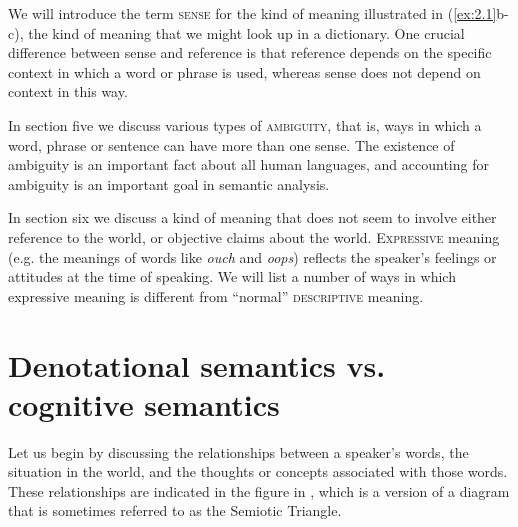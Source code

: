 We will introduce the term \textsc{sense} for the kind of meaning illustrated in (\ref{ex:2.1}b-c), the kind of meaning that we might look up in a dictionary. One crucial difference between sense and reference is that reference depends on the specific context in which a word or phrase is used, whereas sense does not depend on context in this way.



In section five we discuss various types of \textsc{ambiguity}, that is, ways in which a word, phrase or sentence can have more than one sense. The existence of ambiguity is an important fact about all human languages, and accounting for ambiguity is an important goal in semantic analysis.



In section six we discuss a kind of meaning that does not seem to involve either reference to the world, or objective claims about the world. \textsc{Expressive} meaning (e.g. the meanings of words like \textit{ouch} and \textit{oops}) reflects the speaker’s feelings or attitudes at the time of speaking. We will list a number of ways in which expressive meaning is different from “normal” \textsc{descriptive} meaning.


\section{Denotational semantics vs. cognitive semantics}\label{sec:2.2}

Let us begin by discussing the relationships between a speaker’s words, the situation in the world, and the thoughts or concepts associated with those words. These relationships are indicated in the figure in , which is a version of a diagram that is sometimes referred to as the Semiotic Triangle.



 



